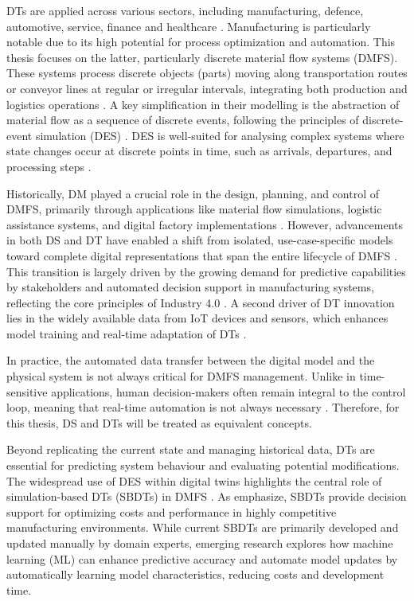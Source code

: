 DTs are applied across various sectors, including manufacturing, defence, automotive, service, finance and healthcare \autocite{Tao2018ijamt}. Manufacturing is particularly notable due to its high potential for process optimization and automation. This thesis focuses on the latter, particularly discrete material flow systems (DMFS). These systems process discrete objects (parts) moving along transportation routes or conveyor lines at regular or irregular intervals, integrating both production and logistics operations \autocite{arnold2005materialfluss, schwede2024learning}. A key simplification in their modelling is the abstraction of material flow as a sequence of discrete events, following the principles of discrete-event simulation (DES) \autocite{kovacs2016mathematical, robinson2014simulation}. DES is well-suited for analysing complex systems where state changes occur at discrete points in time, such as arrivals, departures, and processing steps \autocite{robinson2014simulation}.

Historically, DM played a crucial role in the design, planning, and control of DMFS, primarily through applications like material flow simulations, logistic assistance systems, and digital factory implementations \autocite{Thiede2013}. However, advancements in both DS and DT have enabled a shift from isolated, use-case-specific models toward complete digital representations that span the entire lifecycle of DMFS \autocite{Abdoune2023}. This transition is largely driven by the growing demand for predictive capabilities by stakeholders and automated decision support in manufacturing systems, reflecting the core principles of Industry 4.0 \autocite{frank2019industry}. A second driver of DT innovation lies in the widely available data from IoT devices and sensors, which enhances model training and real-time adaptation of DTs \autocite{Tao2018ijamt}.

In practice, the automated data transfer between the digital model and the physical system is not always critical for DMFS management. Unlike in time-sensitive applications, human decision-makers often remain integral to the control loop, meaning that real-time automation is not always necessary \autocite{schwede2024learning}. Therefore, for this thesis, DS and DTs will be treated as equivalent concepts.

Beyond replicating the current state and managing historical data, DTs are essential for predicting system behaviour and evaluating potential modifications. The widespread use of DES within digital twins highlights the central role of simulation-based DTs (SBDTs) in DMFS \autocite{Lugaresi2021aifac}. As \citeauthor{schwede2024learning} emphasize, SBDTs provide decision support for optimizing costs and performance in highly competitive manufacturing environments. While current SBDTs are primarily developed and updated manually by domain experts, emerging research explores how machine learning (ML) can enhance predictive accuracy and automate model updates by automatically learning model characteristics, reducing costs and development time.

